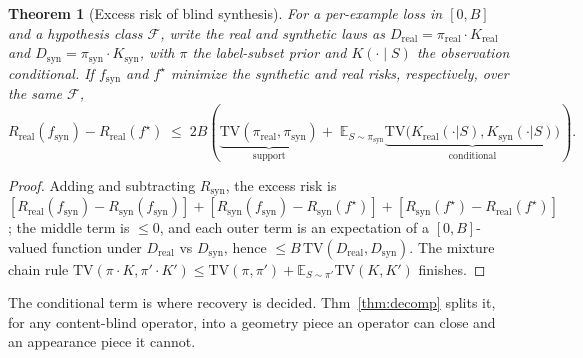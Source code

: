 \documentclass[11pt]{article}
\newtheorem{theorem}{Theorem}
\begin{document}
\begin{theorem}[Excess risk of blind synthesis]\label{thm:excess}
For a per-example loss in $[0,B]$ and a hypothesis class $\mathcal F$, write
the real and synthetic laws as
$D_{\mathrm{real}}=\pi_{\mathrm{real}}\!\cdot\!K_{\mathrm{real}}$ and
$D_{\mathrm{syn}}=\pi_{\mathrm{syn}}\!\cdot\!K_{\mathrm{syn}}$, with $\pi$ the
label-subset prior and $K(\cdot\mid S)$ the observation conditional. If
$f_{\mathrm{syn}}$ and $f^\star$ minimize the synthetic and real risks,
respectively, over the same $\mathcal F$,
\[
R_{\mathrm{real}}(f_{\mathrm{syn}}) - R_{\mathrm{real}}(f^\star)
\;\le\; 2B\!\left(\underbrace{\mathrm{TV}(\pi_{\mathrm{real}},\pi_{\mathrm{syn}})}_{\text{support}}
+\; \mathbb{E}_{S\sim\pi_{\mathrm{syn}}}\!\underbrace{\mathrm{TV}\!\big(K_{\mathrm{real}}(\cdot|S),K_{\mathrm{syn}}(\cdot|S)\big)}_{\text{conditional}}\right).
\]
\end{theorem}
\begin{proof}
Adding and subtracting $R_{\mathrm{syn}}$, the excess risk is
$[R_{\mathrm{real}}(f_{\mathrm{syn}})-R_{\mathrm{syn}}(f_{\mathrm{syn}})]+
[R_{\mathrm{syn}}(f_{\mathrm{syn}})-R_{\mathrm{syn}}(f^\star)]+
[R_{\mathrm{syn}}(f^\star)-R_{\mathrm{real}}(f^\star)]$; the middle term is
$\le 0$, and each outer term is an expectation of a $[0,B]$-valued function
under $D_{\mathrm{real}}$ vs $D_{\mathrm{syn}}$, hence $\le B\,\mathrm{TV}(D_{\mathrm{real}},D_{\mathrm{syn}})$.
The mixture chain rule $\mathrm{TV}(\pi\!\cdot\!K,\pi'\!\cdot\!K')\le
\mathrm{TV}(\pi,\pi')+\mathbb{E}_{S\sim\pi'}\mathrm{TV}(K,K')$ finishes.
\end{proof}

The conditional term is where recovery is decided. Thm~\ref{thm:decomp} splits it, for any
content-blind operator, into a geometry piece an operator can close and an appearance piece
it cannot.
\end{document}
